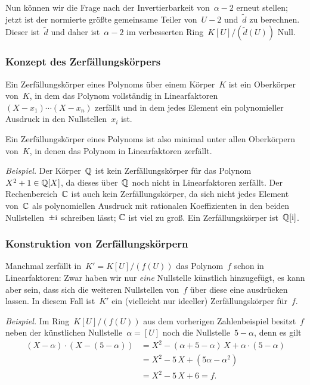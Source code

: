 \documentclass{../../alg2/algblatt}
\begin{document}
Nun können wir die Frage nach der Invertierbarkeit von~$\alpha - 2$ erneut
stellen; jetzt ist der normierte größte gemeinsame Teiler von~$U-2$ und~$\tilde
d$ zu berechnen. Dieser ist~$\tilde d$ und daher ist~$\alpha - 2$ im
verbesserten Ring~$K[U]/(\tilde d(U))$ Null.


\subsubsection*{Konzept des Zerfällungskörpers}

Ein Zerfällungskörper eines Polynoms über einem Körper~$K$ ist ein Oberkörper
von~$K$, in dem das Polynom vollständig in Linearfaktoren $(X-x_1) \cdots
(X-x_n)$ zerfällt und in dem jedes Element ein polynomieller Ausdruck in den
Nullstellen~$x_i$ ist.

Ein Zerfällungskörper eines Polynoms ist also minimal unter allen
Oberkörpern von~$K$, in denen das Polynom in Linearfaktoren zerfällt.

\emph{Beispiel.} Der Körper~$\mathbb{Q}$ ist kein Zerfällungskörper für das
Polynom~$X^2 + 1 \in \mathbb{Q}[X]$, da dieses über~$\mathbb{Q}$ noch nicht in Linearfaktoren
zerfällt. Der Rechenbereich~$\mathbb{C}$ ist auch kein Zerfällungskörper, da sich nicht jedes
Element von~$\mathbb{C}$ als polynomiellen Ausdruck mit rationalen Koeffizienten in
den beiden Nullstellen~$\pm \mathrm{i}$ schreiben lässt; $\mathbb{C}$ ist viel zu groß. Ein
Zerfällungskörper ist~$\mathbb{Q}[\mathrm{i}]$.


\subsubsection*{Konstruktion von Zerfällungskörpern}

Manchmal zerfällt in~$K' = K[U]/(f(U))$ das
Polynom~$f$ schon in Linearfaktoren: Zwar haben wir nur \emph{eine} Nullstelle
künstlich hinzugefügt, es kann aber sein, dass sich die weiteren Nullstellen
von~$f$ über diese eine ausdrücken lassen. In diesem Fall ist~$K'$ ein
(vielleicht nur ideeller) Zerfällungskörper für~$f$.

\emph{Beispiel.} Im Ring~$K[U]/(f(U))$ aus dem vorherigen Zahlenbeispiel
besitzt~$f$ neben der künstlichen Nullstelle~$\alpha = [U]$ noch die
Nullstelle~$5-\alpha$, denn es gilt
\begin{align*}
  (X-\alpha) \cdot (X-(5-\alpha)) &=
  X^2 - (\alpha + 5 - \alpha)\,X + \alpha \cdot (5-\alpha) \\
  &= X^2 - 5\,X + (5\alpha - \alpha^2) \\
  &= X^2 - 5\,X + 6 = f.
\end{align*}
\end{document}
